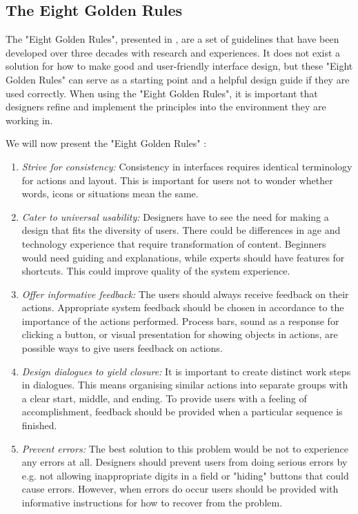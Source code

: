 \subsection{The Eight Golden Rules}
\label{subsec:golden}
The "Eight Golden Rules", presented in \cite{mmi}, are a set of guidelines that have been developed over three decades with research and experiences. It does not exist a solution for how to make good and user-friendly interface design, but these "Eight Golden Rules" can serve as a starting point and a helpful design guide if they are used correctly. When using the "Eight Golden Rules", it is important that designers refine and implement the principles into the environment they are working in. 

We will now present the "Eight Golden Rules" \cite{mmi}:

\begin{enumerate}[{e}.1] 
\item \emph{Strive for consistency:} Consistency in interfaces requires identical terminology for actions and layout. This is important for users not to wonder whether words, icons or situations mean the same. 
\item \emph{Cater to universal usability:} Designers have to see the need for making a design that fits the diversity of users. There could be differences in age and technology experience that require transformation of content. Beginners would need guiding and explanations, while experts should have features for shortcuts. This could improve quality of the system experience. 
\item \emph{Offer informative feedback:} The users should always receive feedback on their actions. Appropriate system feedback should be chosen in accordance to the importance of the actions performed. Process bars, sound as a response for clicking a button, or visual presentation for showing objects in actions, are possible ways to give users feedback on actions.  
\item \emph{Design dialogues to yield closure:} It is important to create distinct work steps in dialogues. This means organising similar actions into separate groups with a clear start, middle, and ending. To provide users with a feeling of accomplishment, feedback should be provided when a particular sequence is finished.     
\item \emph{Prevent errors:} The best solution to this problem would be not to experience any errors at all. Designers should prevent users from doing serious errors by e.g. not allowing inappropriate digits in a field or "hiding" buttons that could cause errors. However, when errors do occur users should be provided with informative instructions for how to recover from the problem.   

\end{enumerate}
